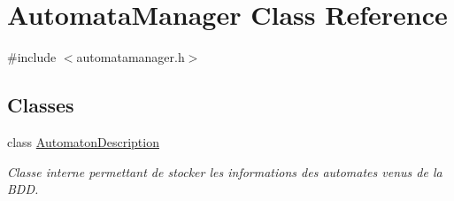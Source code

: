 \hypertarget{class_automata_manager}{}\section{Automata\+Manager Class Reference}
\label{class_automata_manager}


{\ttfamily \#include $<$automatamanager.\+h$>$}

\subsection*{Classes}
\begin{DoxyCompactItemize}
\item 
class \mbox{\hyperlink{class_automata_manager_1_1_automaton_description}{Automaton\+Description}}
\begin{DoxyCompactList}\small\item\em Classe interne permettant de stocker les informations des automates venus de la B\+DD. \end{DoxyCompactList}\end{DoxyCompactItemize}
